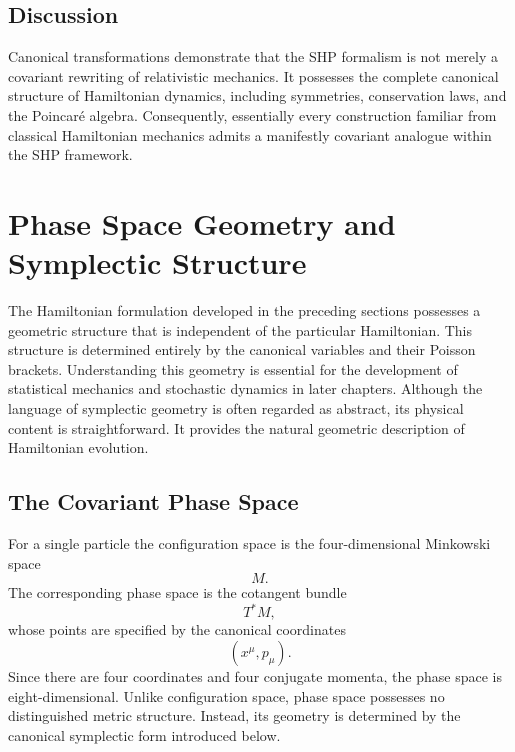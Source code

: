 \subsection{Discussion}
Canonical transformations demonstrate that the SHP formalism is not
merely a covariant rewriting of relativistic mechanics. It possesses the
complete canonical structure of Hamiltonian dynamics, including
symmetries, conservation laws, and the Poincaré algebra.
Consequently, essentially every construction familiar from classical
Hamiltonian mechanics admits a manifestly covariant analogue within the
SHP framework.
\section{Phase Space Geometry and Symplectic Structure}
The Hamiltonian formulation developed in the preceding sections possesses
a geometric structure that is independent of the particular Hamiltonian.
This structure is determined entirely by the canonical variables and
their Poisson brackets. Understanding this geometry is essential for the
development of statistical mechanics and stochastic dynamics in later
chapters.
Although the language of symplectic geometry is often regarded as
abstract, its physical content is straightforward. It provides the
natural geometric description of Hamiltonian evolution.
\subsection{The Covariant Phase Space}
For a single particle the configuration space is the four-dimensional
Minkowski space
\[M.\]
The corresponding phase space is the cotangent bundle
\[T^{*}M,\]
whose points are specified by the canonical coordinates
\[(x^\mu,p_\mu).\]
Since there are four coordinates and four conjugate momenta, the phase
space is eight-dimensional.
Unlike configuration space, phase space possesses no distinguished
metric structure. Instead, its geometry is determined by the canonical
symplectic form introduced below.
